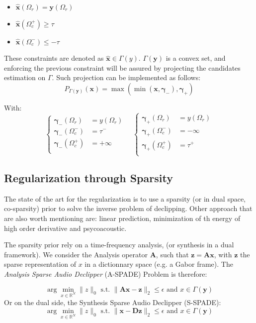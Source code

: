 \documentclass[twocolumn]{scrartcl}
\renewcommand{\vec}[1]{\boldsymbol{#1}}
\begin{document}
\begin{itemize}
  \item \(\hat{\vec{x}}(\Omega_r) = \vec{y}(\Omega_r)\)
  \item \(\hat{\vec{x}}(\Omega_c^+) \ge \tau\)
  \item \(\hat{\vec{x}}(\Omega_c^-) \le -\tau\)
\end{itemize}
These constraints are denoted as \(\hat{\vec{x}} \in \Gamma(y)\). \(\Gamma(\vec{y})\) is a convex set, and enforcing the previous constraint will be assured by projecting the candidates estimation on \(\Gamma\). Such projection can be implemented as follows:
\[ P_{\Gamma(\vec{y})}(\vec{x}) = \max(\min(\vec{x},\vec{\gamma}_{-}),\vec{\gamma}_{+})\]

With:
\[\begin{cases}
    \vec{\gamma}_{-}(\Omega_{r}) &= y(\Omega_{r}) \\
    \vec{\gamma}_{-}(\Omega_{c}^{-}) &= \tau^{-} \\
    \vec{\gamma}_{-}(\Omega_{c}^{+}) &= +\infty \\
  \end{cases} \quad
  \begin{cases}
    \vec{\gamma}_{+}(\Omega_{r}) &= y(\Omega_{r}) \\
    \vec{\gamma}_{+}(\Omega_{c}^{-}) &= -\infty \\
    \vec{\gamma}_{+}(\Omega_{c}^{+}) &= \tau^{+} \\
  \end{cases}\]

\subsection{Regularization through Sparsity}

The state of the art for the regularization is to use a sparsity (or in dual space, co-sparsity) prior to solve the inverse problem of declipping. Other approach that are also worth mentioning are: linear prediction, minimization of th energy of high order derivative and psycoacoustic.

The sparsity prior rely on a time-frequency analysis, (or synthesis in a dual framework). We consider the Analysis operator \(\vec{A}\), such that \(\vec{z} =\vec{Ax}\), with \(\vec{z}\) the sparse representation of \(x\) in a dictionnary space (e.g. a Gabor frame).
The \emph{Analysis Sparse Audio Declipper} (A-SPADE) Problem is  therefore:

\begin{equation}
  \label{eq:ASPADE}
  \arg\min_{x\in \mathbb{R}^{N}} \|z\|_{0} \text{ s.t. } \|\vec{Ax-z}\|_{2} \le \epsilon \text{ and } x\in \Gamma(\vec{y})
\end{equation}
Or on  the dual side, the Synthesis Sparse Audio Declipper (S-SPADE):
\begin{equation}
  \label{eq:SSPADE}
  \arg\min_{x\in \mathbb{R}^{N}} \|z\|_{0} \text{ s.t. } \|\vec{x-Dz}\|_{2} \le \epsilon \text{ and } x\in \Gamma(\vec{y})
\end{equation}
\end{document}
